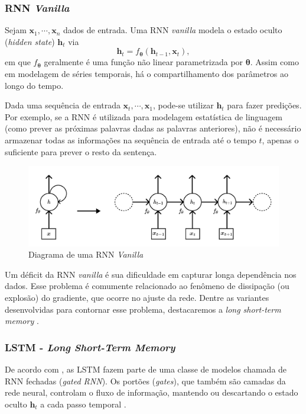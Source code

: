 \documentclass{automatextcc}
\newcommand{\bs}[1]{\boldsymbol{#1}}
\begin{document}
\subsubsection{RNN \textit{Vanilla}}
Sejam $\bs{x}_{1},\cdots,\bs{x}_{n}$ dados de entrada. Uma  RNN \textit{vanilla} modela o estado oculto (\textit{hidden state}) $\bs{h}_{t}$ via
\begin{equation*}
    \bs{h}_t = f_{\bs{{\theta}}} (\bs{h}_{t-1}, \bs{x}_{t}),    
\end{equation*}
em que $f_{\bs{\theta}}$ geralmente é uma função não linear parametrizada por $\bs{\theta}$. Assim como em modelagem de séries temporais, há o compartilhamento dos parâmetros ao longo do tempo.

Dada uma sequência de entrada $\bs{x}_{t},\cdots,\bs{x}_{1}$, pode-se utilizar $\bs{h}_{t}$ para fazer predições. Por exemplo, se a RNN é utilizada para modelagem estatística de linguagem (como prever as próximas palavras dadas as palavras anteriores), não é necessário armazenar todas as informações na sequência de entrada até o tempo $t$, apenas o suficiente para prever o resto da sentença.

\begin{figure}
    \centering
    \includegraphics[width=\textwidth]{figuras/rnn_hidden_state.pdf}
	\caption{Diagrama de uma RNN \textit{Vanilla} \citep[adaptado de][]{goodfellow2016, kamath2019}}
\end{figure}

Um déficit da RNN \textit{vanilla} é sua dificuldade em capturar longa dependência nos dados. Esse problema é comumente relacionado ao fenômeno de dissipação (ou explosão) do gradiente, que ocorre no ajuste da rede. Dentre as variantes desenvolvidas para contornar esse problema, destacaremos a \textit{long short-term memory} \citep{goodfellow2016, fan2021}.



\subsubsection{LSTM - \textit{Long Short-Term Memory}}
De acordo com \citet{goodfellow2016}, as LSTM fazem parte de uma classe de modelos chamada de RNN fechadas (\textit{gated RNN}). Os portões (\textit{gates}), que também são camadas da rede neural, controlam o fluxo de informação, mantendo ou descartando o estado oculto $\bs{h}_{t}$ a cada passo temporal \citep{kamath2019}. 
\end{document}
